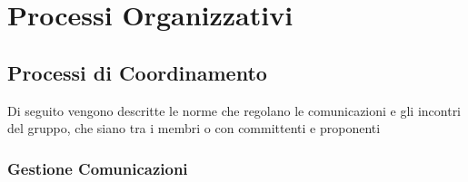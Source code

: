 \section{Processi Organizzativi}





\subsection{Processi di Coordinamento}
Di seguito vengono descritte le norme che regolano le comunicazioni e gli incontri del gruppo, che siano tra i membri o con committenti e proponenti
\subsubsection{Gestione Comunicazioni}
